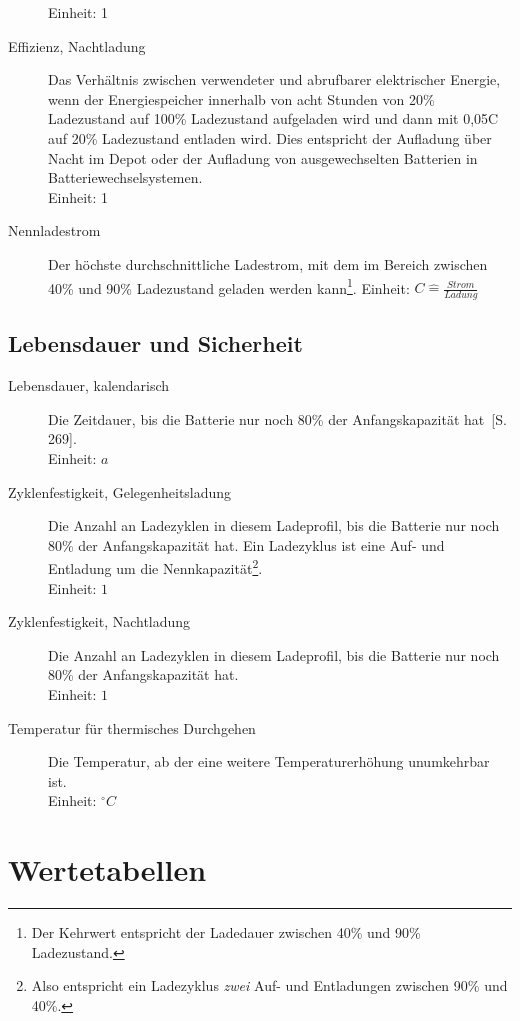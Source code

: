 \begin{description}
	Einheit: 1
	\item[Effizienz, Nachtladung] Das Verhältnis zwischen verwendeter und abrufbarer elektrischer Energie, wenn der Energiespeicher innerhalb von acht Stunden von 20\% Ladezustand auf 100\% Ladezustand aufgeladen wird und dann mit 0,05C auf 20\% Ladezustand entladen wird. Dies entspricht der Aufladung über Nacht im Depot oder der Aufladung von ausgewechselten Batterien in Batteriewechselsystemen.\\
	Einheit: 1
	\item[Nennladestrom] Der höchste durchschnittliche Ladestrom, mit dem im Bereich zwischen 40\% und 90\% Ladezustand geladen werden kann\footnote{Der Kehrwert entspricht der Ladedauer zwischen 40\% und 90\% Ladezustand.}.
	Einheit: $C\hat{=} \frac{Strom}{Ladung}$
\end{description}

\subsection{Lebensdauer und Sicherheit}
\begin{description}
	\item[Lebensdauer, kalendarisch] Die Zeitdauer, bis die Batterie nur noch 80\% der Anfangskapazität hat~\cite{Sterner:2014}[S. 269]. \\
	Einheit: $a$
	\item[Zyklenfestigkeit, Gelegenheitsladung] Die Anzahl an Ladezyklen in diesem Ladeprofil, bis die Batterie nur noch 80\% der Anfangskapazität hat. Ein Ladezyklus ist eine Auf- und Entladung um die Nennkapazität\footnote{Also entspricht ein Ladezyklus \emph{zwei} Auf- und Entladungen zwischen 90\% und 40\%.}.\\
	Einheit: $1$
	\item[Zyklenfestigkeit, Nachtladung] Die Anzahl an Ladezyklen in diesem Ladeprofil, bis die Batterie nur noch 80\% der Anfangskapazität hat.\\
	Einheit: $1$
	\item[Temperatur für thermisches Durchgehen] Die Temperatur, ab der eine weitere Temperaturerhöhung unumkehrbar ist.\\
	Einheit: $^\circ C$
\end{description}


\section{Wertetabellen}
\label{vergleichstabellen_speichertechnologien}

